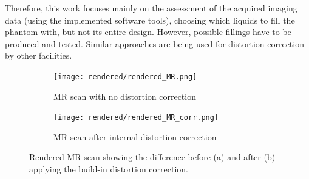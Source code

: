 Therefore, this work focuses mainly on the assessment of the acquired imaging data (using the implemented software tools), choosing which liquids to fill the phantom with, but not its entire design.
However, possible fillings have to be produced and tested.
Similar approaches are being used for distortion correction by other facilities. \cite{Price2015, Petersch2004, Torfeh2015, Wang2004, Wang2004b, Mizowaki2000}


\begin{figure}[!thb]
\centering
  \begin{subfigure}[b]{0.49\textwidth}
  \centering
    \texttt{[image: rendered/rendered\_MR.png]}
    \caption{MR scan with no distortion correction}
    \label{fig:rendered_MR}
  \end{subfigure}
  \begin{subfigure}[b]{0.49\textwidth}
  \centering
      \texttt{[image: rendered/rendered\_MR\_corr.png]}
    \caption{MR scan after internal distortion correction}
    \label{fig:rendered_MR_corr}
  \end{subfigure}
  \caption{Rendered MR scan showing the difference before (a) and after (b) applying the build-in distortion correction.}
  \label{fig:rendered_dist}
\end{figure}


